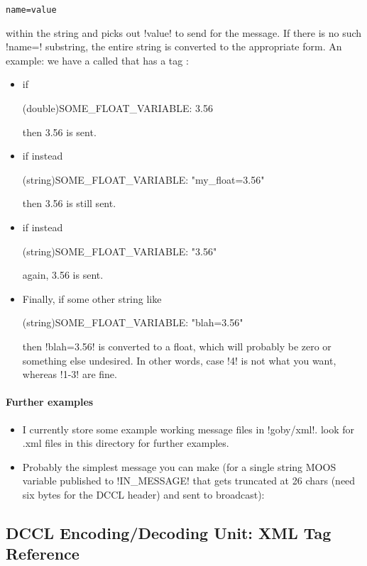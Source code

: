 \begin{itemize}
\begin{verbatim}
name=value
\end{verbatim}
within the string and picks out !value! to send for the message. If there is no such !name=! substring, the entire string is converted to the appropriate form. An example: we have a  called  that has a tag : 
\begin{itemize}
\item if
\begin{boxedverbatim}
(double)SOME_FLOAT_VARIABLE: 3.56
\end{boxedverbatim}
then 3.56 is sent.
\item if instead 
\begin{boxedverbatim}
(string)SOME_FLOAT_VARIABLE: "my_float=3.56"
\end{boxedverbatim}
then 3.56 is still sent.
\item if instead
\begin{boxedverbatim}
(string)SOME_FLOAT_VARIABLE: "3.56"
\end{boxedverbatim}
again, 3.56 is sent.
\item Finally, if some other string like
\begin{boxedverbatim}
(string)SOME_FLOAT_VARIABLE: "blah=3.56"
\end{boxedverbatim}
\resetbvlinenumber
then !blah=3.56! is converted to a float, which will probably be zero or something else undesired. In other words, case !4! is not what you want, whereas !1-3! are fine.
\end{itemize}
\end{itemize}
\paragraph{Further examples} \label{sec:ex}
\begin{itemize}
\item I currently store some example working message files in !goby/xml!. look for .xml files in this directory for further examples.
\item Probably the simplest message you can make (for a single string MOOS variable published to !IN_MESSAGE! that gets truncated at 26 chars (need six bytes for the DCCL header) and sent to broadcast):
\resetbvlinenumber
\end{itemize}


\subsection{DCCL Encoding/Decoding Unit: XML Tag Reference}

